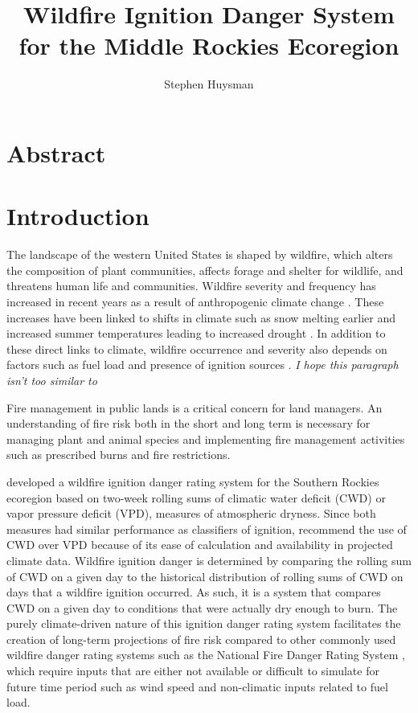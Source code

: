 \documentclass[11pt]{article}
\author{Stephen Huysman}
\title{Wildfire Ignition Danger System for the Middle Rockies Ecoregion}
\begin{document}
\maketitle

\tableofcontents

\section{Abstract}

\section{Introduction}

The landscape of the western United States is shaped by wildfire, which alters the composition of plant communities, affects forage and shelter for wildlife, and threatens human life and communities.  Wildfire severity and frequency has increased in recent years as a result of anthropogenic climate change \citep{abatzoglouImpactAnthropogenicClimate2016}.  These increases have been linked to shifts in climate such as snow melting earlier \citep{tercekForecasts21stCentury2016} and increased summer temperatures leading to increased drought \citep{runningGlobalWarmingCausing2006}.  In addition to these direct links to climate, wildfire occurrence and severity also depends on factors such as fuel load and presence of ignition sources \citep{mckenzieClimateChangeEcohydrology2017}.
\textit{I hope this paragraph isn't too similar to} 

Fire management in public lands is a critical concern for land managers.  An understanding of fire risk both in the short and long term is necessary for managing plant and animal species and implementing fire management activities such as prescribed burns and fire restrictions.  

\citet{thomaWaterBalanceIndicator2020} developed a wildfire ignition danger rating system for the Southern Rockies ecoregion \citep{omernikEcoregionsConterminousUnited1987} based on two-week rolling sums of climatic water deficit (CWD) or vapor pressure deficit (VPD), measures of atmospheric dryness. Since both measures had similar performance as classifiers of ignition, \citet{thomaWaterBalanceIndicator2020} recommend the use of CWD over VPD because of its ease of calculation and availability in projected climate data.  Wildfire ignition danger is determined by comparing the rolling sum of CWD on a given day to the historical distribution of rolling sums of CWD on days that a wildfire ignition occurred. As such, it is a system that compares CWD on a given day to conditions that were actually dry enough to burn. The purely climate-driven nature of this ignition danger rating system facilitates the creation of long-term projections of fire risk compared to other commonly used wildfire danger rating systems such as the National Fire Danger Rating System \citep{degrootChapter11Wildland2015}, which require inputs that are either not available or difficult to simulate for future time period such as wind speed and non-climatic inputs related to fuel load.  
\end{document}

